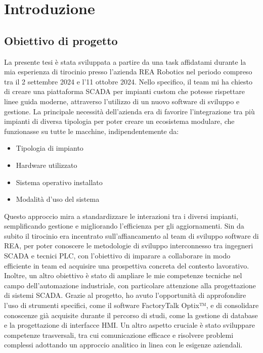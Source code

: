 \chapter{Introduzione}

\section{Obiettivo di progetto} 
La presente tesi è stata sviluppata a partire da una task affidatami durante la mia esperienza di tirocinio presso l'azienda REA Robotics nel periodo compreso tra il 2 settembre 2024 e l'11 ottobre 2024. Nello specifico, il team mi ha chiesto di creare una piattaforma SCADA per impianti custom che potesse rispettare linee guida moderne, attraverso l'utilizzo di un nuovo software di sviluppo e gestione. La principale necessità dell'azienda era di favorire l'integrazione tra più impianti di diversa tipologia per poter creare un ecosistema modulare, che funzionasse su tutte le macchine, indipendentemente da:
\begin{itemize}
    \item Tipologia di impianto
    \item Hardware utilizzato
    \item Sistema operativo installato
    \item Modalità d'uso del sistema
\end{itemize}
Questo approccio mira a standardizzare le interazioni tra i diversi impianti, semplificando gestione e migliorando l'efficienza per gli aggiornamenti. Sin da subito il tirocinio era incentrato sull'affiancamento al team di sviluppo software di REA, per poter conoscere le metodologie di sviluppo interconnesso tra ingegneri SCADA e tecnici PLC, con l'obiettivo di imparare a collaborare in modo efficiente in team ed acquisire una prospettiva concreta del contesto lavorativo. Inoltre, un altro obiettivo è stato di ampliare le mie competenze tecniche nel campo dell'automazione industriale, con particolare attenzione alla progettazione di sistemi SCADA. Grazie al progetto, ho avuto l'opportunità di approfondire l'uso di strumenti specifici, come il software FactoryTalk Optix™, e di consolidare conoscenze già acquisite durante il percorso di studi, come la gestione di database e la progettazione di interfacce HMI. Un altro aspetto cruciale è stato sviluppare competenze trasversali, tra cui comunicazione efficace e risolvere problemi complessi adottando un approccio analitico in linea con le esigenze aziendali.

